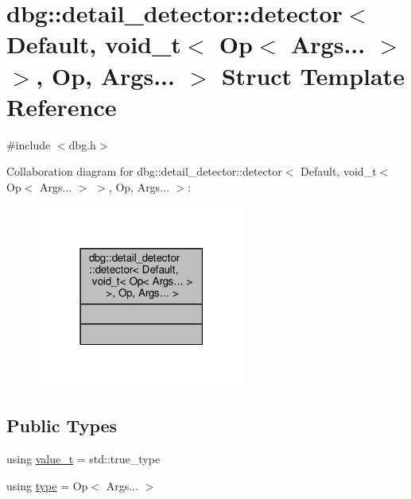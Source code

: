 \hypertarget{structdbg_1_1detail__detector_1_1detector_3_01Default_00_01void__t_3_01Op_3_01Args_8_8_8_01_4_01_4_00_01Op_00_01Args_8_8_8_01_4}{}\section{dbg\+:\+:detail\+\_\+detector\+:\+:detector$<$ Default, void\+\_\+t$<$ Op$<$ Args... $>$ $>$, Op, Args... $>$ Struct Template Reference}
\label{structdbg_1_1detail__detector_1_1detector_3_01Default_00_01void__t_3_01Op_3_01Args_8_8_8_01_4_01_4_00_01Op_00_01Args_8_8_8_01_4}


{\ttfamily \#include $<$dbg.\+h$>$}



Collaboration diagram for dbg\+:\+:detail\+\_\+detector\+:\+:detector$<$ Default, void\+\_\+t$<$ Op$<$ Args... $>$ $>$, Op, Args... $>$\+:\nopagebreak
\begin{figure}[H]
\begin{center}
\leavevmode
\includegraphics[width=195pt]{d5/d59/structdbg_1_1detail__detector_1_1detector_3_01Default_00_01void__t_3_01Op_3_01Args_8_8_8_01_4_010a7eb40f65b9d8d3493151bfdc3019fa}
\end{center}
\end{figure}
\subsection*{Public Types}
\begin{DoxyCompactItemize}
\item 
using \hyperlink{structdbg_1_1detail__detector_1_1detector_3_01Default_00_01void__t_3_01Op_3_01Args_8_8_8_01_4_01_4_00_01Op_00_01Args_8_8_8_01_4_ab9dc20c0565be267d2d98b0e0f4a565b}{value\+\_\+t} = std\+::true\+\_\+type
\item 
using \hyperlink{structdbg_1_1detail__detector_1_1detector_3_01Default_00_01void__t_3_01Op_3_01Args_8_8_8_01_4_01_4_00_01Op_00_01Args_8_8_8_01_4_a2119ba35e684b8292286546a1cea10d1}{type} = Op$<$ Args... $>$
\end{DoxyCompactItemize}


